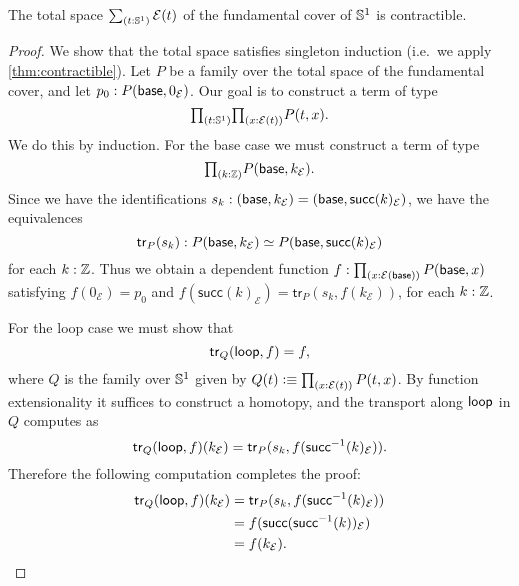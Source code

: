 \begin{thm}\label{thm:circle_fundamental}
The total space $\sm{t:\sphere{1}}\mathcal{E}(t)$ of the fundamental cover of $\mathbb{S}^{1}$ is contractible.
\end{thm}

\begin{proof}
We show that the total space satisfies singleton induction (i.e.~we apply \cref{thm:contractible}). Let $P$ be a family over the total space of the fundamental cover, and let $p_0:P(\mathsf{base},0_{\mathcal{E}})$. Our goal is to construct a term of type
\begin{equation*}
\prd{t:\sphere{1}}{x:\mathcal{E}(t)} P(t,x).
\end{equation*}
We do this by induction. For the base case we must construct a term of type
\begin{equation*}
\prd{k:\Z}P(\base,k_{\mathcal{E}}).
\end{equation*}
Since we have the identifications $s_k: (\mathsf{base},k_{\mathcal{E}})=(\mathsf{base},\mathsf{succ}(k)_{\mathcal{E}})$, we have the equivalences
\begin{equation*}
\mathsf{tr}_P(s_k) : \eqv{P(\base,k_{\mathcal{E}})}{P(\base,\mathsf{succ}(k)_{\mathcal{E}})}
\end{equation*}
for each $k:\mathbb{Z}$. Thus we obtain a dependent function $f:\prd{x:\mathcal{E}(\base)}P(\base,x)$ satisfying $f(0_{\mathcal{E}})=p_0$ and $f(\mathsf{succ}(k)_{\mathcal{E}})=\mathsf{tr}_P(s_k,f(k_{\mathcal{E}}))$, for each $k:\mathbb{Z}$. 

For the loop case we must show that
\begin{equation*}
\mathsf{tr}_Q(\mathsf{loop},f)=f,
\end{equation*}
where $Q$ is the family over $\mathbb{S}^{1}$ given by $Q(t)\defeq \prd{x:\mathcal{E}(t)} P(t,x)$. By function extensionality it suffices to construct a homotopy, and the transport along $\mathsf{loop}$ in $Q$ computes as
\begin{equation*}
\mathsf{tr}_Q(\mathsf{loop},f)(k_{\mathcal{E}})= \mathsf{tr}_P(s_k,f(\mathsf{succ}^{-1}(k)_{\mathcal{E}})). 
\end{equation*}
Therefore the following computation completes the proof:
\begin{align*}
\mathsf{tr}_Q(\mathsf{loop},f)(k_{\mathcal{E}})
& = \mathsf{tr}_P(s_k,f(\mathsf{succ}^{-1}(k)_{\mathcal{E}})) \\
& = f(\mathsf{succ}(\mathsf{succ}^{-1}(k))_{\mathcal{E}}) \\
& = f(k_{\mathcal{E}}).\qedhere
\end{align*}
\end{proof}

